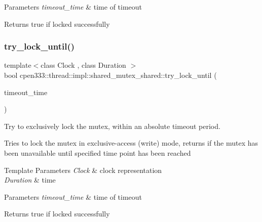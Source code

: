\begin{DoxyParams}{Parameters}
{\em timeout\+\_\+time} & time of timeout \\
\hline
\end{DoxyParams}
\begin{DoxyReturn}{Returns}
true if locked successfully 
\end{DoxyReturn}
\mbox{\label{classcpen333_1_1thread_1_1impl_1_1shared__mutex__shared_a58baad110b6dfb6bc036a46f846f9f00}} 
\subsubsection{\texorpdfstring{try\+\_\+lock\+\_\+until()}{try\_lock\_until()}}
{\footnotesize\ttfamily template$<$class Clock , class Duration $>$ \\
bool cpen333\+::thread\+::impl\+::shared\+\_\+mutex\+\_\+shared\+::try\+\_\+lock\+\_\+until (\begin{DoxyParamCaption}\item[{const std\+::chrono\+::time\+\_\+point$<$ Clock, Duration $>$ \&}]{timeout\+\_\+time }\end{DoxyParamCaption})\hspace{0.3cm}{\ttfamily [inline]}}



Try to exclusively lock the mutex, within an absolute timeout period. 

Tries to lock the mutex in exclusive-\/access (write) mode, returns if the mutex has been unavailable until specified time point has been reached


\begin{DoxyTemplParams}{Template Parameters}
{\em Clock} & clock representation \\
\hline
{\em Duration} & time \\
\hline
\end{DoxyTemplParams}

\begin{DoxyParams}{Parameters}
{\em timeout\+\_\+time} & time of timeout \\
\hline
\end{DoxyParams}
\begin{DoxyReturn}{Returns}
true if locked successfully 
\end{DoxyReturn}
\mbox{\label{classcpen333_1_1thread_1_1impl_1_1shared__mutex__shared_aa7e6c6ac6bbd3b72ada12d9f178c0cdd}} 
